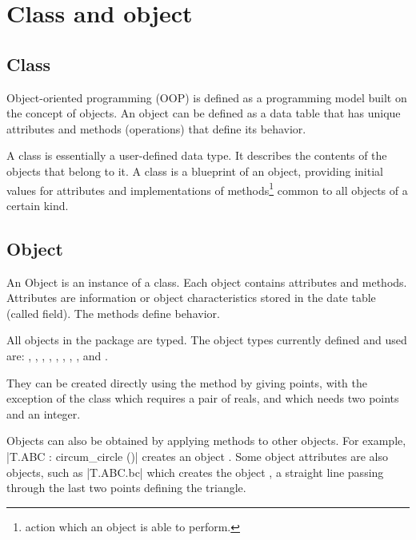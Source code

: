 \newpage

\section{Class and object} %
\label{sec:class_and_object}

\subsection{Class} %
\label{sub:class}

 Object-oriented programming (OOP) is defined as a programming model built on the concept of objects. An object can be defined as a data table that has unique attributes and methods (operations) that define its behavior.
 
 \vspace{1em}
A class is essentially a user-defined data type. It describes the contents of the objects that belong to it. A class is a  blueprint of an object, providing initial values for   attributes and implementations of methods\footnote{action which an object is able to perform.} common to all objects of a certain kind.

\subsection{Object} %
\label{sub:object}
 An Object is an instance of a class. Each object contains attributes and methods. Attributes are information or object characteristics stored in the date table (called field). The methods define behavior.
 
  \vspace{1em}
 All objects in the package are typed. The object types currently defined and used are: , , , , , , , ,  and . 

They can be created directly using the method  by giving points, with the exception of the  class which requires a pair of reals, and  which needs two points and an integer.

 Objects can also be obtained by applying methods to other objects. For example, |T.ABC : circum_circle ()| creates an object . Some object attributes are also objects, such as |T.ABC.bc| which creates the object , a straight line passing through the last two points defining the triangle.

